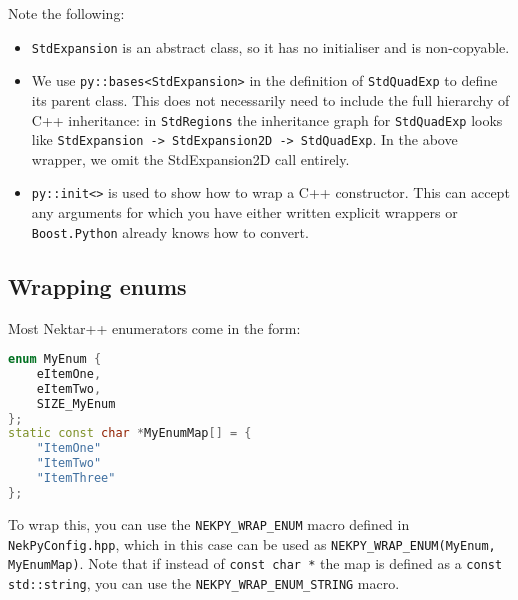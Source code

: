 Note the following:

\begin{itemize}
	\item \texttt{StdExpansion} is an abstract class, so it has no initialiser and is
  		non-copyable.
  	\item We use \texttt{py::bases<StdExpansion>} in the definition of \texttt{StdQuadExp} 
  		to define its parent class. This does not necessarily need to include the full hierarchy
  		of C++ inheritance: in \texttt{StdRegions} the inheritance graph for \texttt{StdQuadExp}
  		looks like \texttt{StdExpansion -> StdExpansion2D -> StdQuadExp}. In the above wrapper, 
  		we omit the StdExpansion2D call entirely.
	\item \texttt{py::init<>} is used to show how to wrap a C++ constructor. This can accept
  		any arguments for which you have either written explicit wrappers or
  		\texttt{Boost.Python} already knows how to convert.
\end{itemize}

\subsection{Wrapping enums}

Most Nektar++ enumerators come in the form:

\begin{lstlisting}[language=C++]
enum MyEnum {
    eItemOne,
    eItemTwo,
    SIZE_MyEnum
};
static const char *MyEnumMap[] = {
    "ItemOne"
    "ItemTwo"
    "ItemThree"
};
\end{lstlisting}

To wrap this, you can use the \texttt{NEKPY\_WRAP\_ENUM} macro defined in
\texttt{NekPyConfig.hpp}, which in this case can be used as 
\texttt{NEKPY\_WRAP\_ENUM(MyEnum, MyEnumMap)}. Note that if instead of 
\texttt{const char *} the map is defined as a \texttt{const std::string}, 
you can use the \texttt{NEKPY\_WRAP\_ENUM\_STRING} macro.
